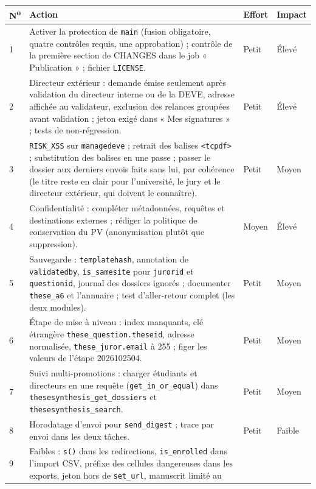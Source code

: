 \documentclass[11pt,a4paper]{article}
\newcommand{\fichier}[1]{\texttt{\small #1}}
\newcommand{\code}[1]{\texttt{#1}}
\begin{document}
\begin{longtable}{@{}p{0.6cm}p{11.2cm}p{1.6cm}p{1.6cm}@{}}
\toprule
\textbf{N\textsuperscript{o}} & \textbf{Action} & \textbf{Effort} & \textbf{Impact} \\
\midrule
\endhead
1 & Activer la protection de \code{main} (fusion obligatoire, quatre contrôles requis, une
    approbation) ; contrôle de la première section de CHANGES dans le job « Publication » ;
    fichier \fichier{LICENSE}. & Petit & Élevé \\
2 & Directeur extérieur : demande émise seulement après validation du directeur interne ou de la
    DEVE, adresse affichée au validateur, exclusion des relances groupées avant validation ;
    jeton exigé dans « Mes signatures » ; tests de non-régression. & Petit & Élevé \\
3 & \code{RISK\_XSS} sur \code{managedeve} ; retrait des balises \code{<tcpdf>} ;
    substitution des balises en une passe ; passer le dossier aux derniers envois faits sans
    lui, par cohérence (le titre reste en clair pour l'université, le jury et le directeur
    extérieur, qui doivent le connaître). & Petit & Moyen \\
4 & Confidentialité : compléter métadonnées, requêtes et destinations externes ; rédiger la
    politique de conservation du PV (anonymisation plutôt que suppression). & Moyen & Élevé \\
5 & Sauvegarde : \code{templatehash}, annotation de \code{validatedby}, \code{is\_samesite} pour
    \code{jurorid} et \code{questionid}, journal des dossiers ignorés ; documenter
    \code{these\_a6} et l'annuaire ; test d'aller-retour complet (les deux modules). & Petit &
    Moyen \\
6 & Étape de mise à niveau : index manquants, clé étrangère \code{these\_question.theseid},
    adresse normalisée, \code{these\_juror.email} à 255 ; figer les valeurs de l'étape
    2026102504. & Petit & Moyen \\
7 & Suivi multi-promotions : charger étudiants et directeurs en une requête
    (\code{get\_in\_or\_equal}) dans \code{thesesynthesis\_get\_dossiers} et
    \code{thesesynthesis\_search}. & Petit & Moyen \\
8 & Horodatage d'envoi pour \code{send\_digest} ; trace par envoi dans les deux tâches. & Petit
    & Faible \\
9 & Faibles : \code{s()} dans les redirections, \code{is\_enrolled} dans l'import CSV, préfixe
    des cellules dangereuses dans les exports, jeton hors de \code{set\_url}, manuscrit limité au

\end{longtable}
\end{document}
